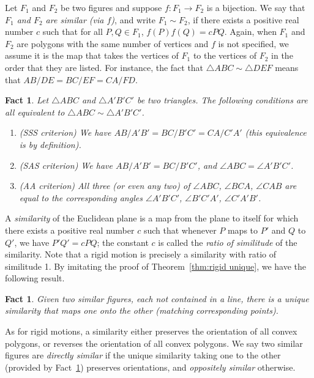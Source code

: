 \documentclass[12pt]{book}
\numberwithin{exc}{section}
\numberwithin{figure}{section}
\newtheorem{fact}[theorem]{Fact}
\numberwithin{equation}{theorem}
\def\ang{\angle}
\begin{document}
Let $F_1$ and $F_2$ be two figures and suppose $f: F_1 \to F_2$ is a bijection.
We say that \emph{$F_1$ and $F_2$ are similar (via $f$)},  and write $F_1 \sim F_2$, if
there exists a positive real number $c$ such that for all $P,Q \in F_1$,
$f(P)f(Q) = cPQ$. Again, when $F_1$ and $F_2$ are polygons with the same number
of vertices and $f$ is not specified, we assume it is the map that takes
the vertices of $F_1$ to the vertices of $F_2$ in the order that they are
listed. For instance, the fact that $\triangle ABC \sim \triangle DEF$
means that $AB/DE = BC/EF = CA/FD$.

\begin{fact}
Let $\triangle ABC$ and $\triangle A'B'C'$ be two triangles. The following conditions are
all equivalent to $\triangle ABC \sim \triangle A'B'C'$.
\begin{enumerate}
\item[(a)] (SSS criterion) We have $AB/A'B'= BC/B'C' = CA/C'A'$
(this equivalence is by definition).
\item[(b)] (SAS criterion) We have $AB/A'B' = BC/B'C'$, and
$\angle ABC = \angle A'B'C'$.
\item[(c)] (AA criterion) All three (or even any two) of $\ang ABC$, $\ang BCA$, $\ang CAB$ are equal to the corresponding
angles $\ang A'B'C'$, $\ang B'C'A'$, $\ang C'A'B'$.
\end{enumerate}
\end{fact}

A \emph{similarity} 
of the Euclidean plane is a map from the plane to itself for which
there exists a positive real number $c$ such that whenever
$P$ maps to $P'$ and $Q$ to $Q'$, we have 
$P'Q' = c PQ$; the constant $c$ is called the \emph{ratio of 
similitude}  of the similarity.
Note that a rigid motion 
is precisely a similarity with ratio of similitude 1.
By imitating the proof of Theorem~\ref{thm:rigid unique}, we have the following
result.
\begin{fact} \label{fact:sim unique}
Given two similar figures, each not contained in a line, there is a unique similarity that maps one onto the other (matching corresponding points).
\end{fact}
As for rigid motions, a similarity either preserves the orientation of all
convex polygons, or reverses the orientation of all convex polygons. We say two similar figures are \emph{directly similar}
 if the unique
similarity taking one to the other (provided by
Fact~\ref{fact:sim unique}) preserves orientations, and
\emph{oppositely similar}  otherwise. 
\end{document}
